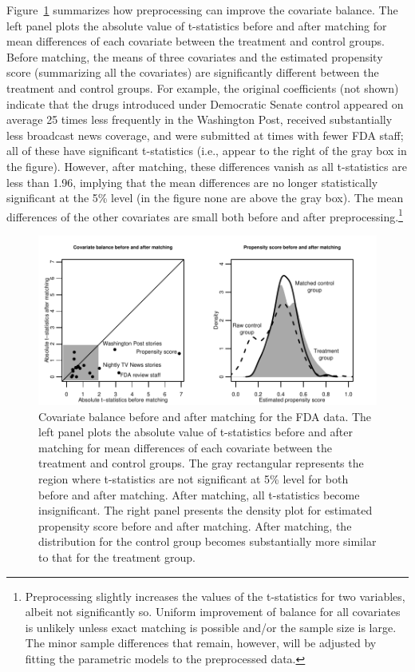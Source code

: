 \documentclass[11pt,titlepage]{article}
\begin{document}
Figure~\ref{fg:fdabal} summarizes how preprocessing can improve the
covariate balance. The left panel plots the absolute value of
t-statistics before and after matching for mean differences of each
covariate between the treatment and control groups.  Before matching,
the means of three covariates and the estimated propensity score
(summarizing all the covariates) are significantly different between
the treatment and control groups.  For example, the original
coefficients (not shown) indicate that the drugs introduced under
Democratic Senate control appeared on average 25 times less frequently
in the Washington Post, received substantially less broadcast news
coverage, and were submitted at times with fewer FDA staff; all of
these have significant t-statistics (i.e., appear to the right of the
gray box in the figure).  However, after matching, these differences
vanish as all t-statistics are less than 1.96, implying that the mean
differences are no longer statistically significant at the 5\% level
(in the figure none are above the gray box).  The mean differences of
the other covariates are small both before and after
preprocessing.\footnote{Preprocessing slightly increases the values of
  the t-statistics for two variables, albeit not significantly so.
  Uniform improvement of balance for all covariates is unlikely unless
  exact matching is possible and/or the sample size is large. The
  minor sample differences that remain, however, will be adjusted by
  fitting the parametric models to the preprocessed data.}
\begin{figure}[t] 
 \begin{center}
   \includegraphics{figs/fdabal.pdf}
  \end{center}
  \vspace{-0.275in}
  \caption{Covariate balance before and after matching for the FDA data.
    The left panel plots the absolute value of t-statistics before and
    after matching for mean differences of each covariate between the
    treatment and control groups. The gray rectangular represents the
    region where t-statistics are not significant at 5\% level for
    both before and after matching. After matching, all t-statistics
    become insignificant. The right panel presents the density plot
    for estimated propensity score before and after matching. After
    matching, the distribution for the control group becomes
    substantially more similar to that for the treatment group.}
  \label{fg:fdabal}
\end{figure}
\end{document}
